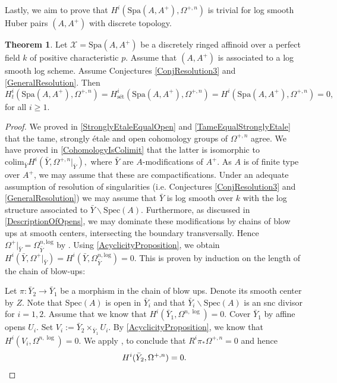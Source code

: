 \documentclass{amsart}
\def\Spa{\textrm{Spa}}
\def\Spec{\textrm{Spec}}
\theoremstyle{definition}
\newtheorem{theorem}{Theorem}[section]
\newcommand\llog{\mathrm{log}}
\numberwithin{equation}{section}
\begin{document}
Lastly, we aim to prove that  $H^{i}(\Spa(A,A^+),\Omega^{+,n})$ is trivial for log smooth Huber pairs $(A,A^+)$ with discrete topology. 
\begin{theorem}\label{CohomologyOfOmega+IsZero}
	Let $\mathcal{X}=\Spa(A,A^+)$ be a discretely ringed affinoid over a perfect field $k$ of positive characteristic $p$. Assume that $(A,A^+)$ is associated to a log smooth log scheme. Assume Conjectures \ref{ConjResolution3} and \ref{GeneralResolution}. Then
	\[
	H^i_t(\Spa(A,A^+),\Omega^{+,n})=H^i_{\textrm{s\'et}}(\Spa(A,A^+),\Omega^{+,n})=H^i(\Spa(A,A^+),\Omega^{+,n})=0,
	\] 
	for all $i\geq 1$.
\end{theorem}
\begin{proof}
	We proved in \cref{StronglyEtaleEqualOpen} and \cref{TameEqualStronglyEtale} that the tame, strongly \'etale and open cohomology groups of $\Omega^{+,n}$ agree.
	We have proved in \cref{CohomologyIsColimit} that the latter is isomorphic to
	 $\textrm{colim}_{\bar{Y}}H^i(\bar{Y},\Omega^{+,n}|_{\bar{Y}}),$
	where $\bar{Y}$ are $A$-modifications of $A^+$. As $A$ is of finite type over $A^+$, we may assume that these are compactifications. Under an adequate assumption of resolution of singularities (i.e. Conjectures \ref{ConjResolution3} and \ref{GeneralResolution}) we may assume that $\bar{Y}$ is log smooth over $k$ with the log structure associated to $\bar{Y}\backslash \Spec(A)$. Furthermore, as discussed in \cref{DescriptionOfOpens}, we may dominate these modifications by chains of blow ups at smooth centers, intersecting the boundary transversally.  Hence $\Omega^+|_{\bar{Y}}=\Omega^{n,\llog}_{\bar{Y}}$ by \cite[Theorem 8.12]{LogDiff}. Using \cref{AcyclicityProposition}, we obtain $H^i(\bar{Y},\Omega^+|_{\bar{Y}})=H^i(\bar{Y},\Omega^{n,\llog}_{\bar{Y}})=0$. This is proven by induction on the length of the chain of blow-ups:
	
	Let $\pi:\bar{Y}_2\to \bar{Y}_1$ be a morphism in the chain of blow ups. Denote its smooth center by $Z$. Note that $\Spec(A)$ is open in $\bar{Y}_i$ and that $\bar{Y}_i\backslash \Spec(A)$ is an snc divisor for $i=1,2$.  Assume that we know that $H^i(\bar{Y}_1, \Omega^{n,\log})=0$. Cover $\bar{Y}_1$ by affine opens $U_i$. Set $V_i:=\bar{Y}_2\times_{\bar{Y}_1}U_i$. By \cref{AcyclicityProposition}, we know that $H^i(V_i,\Omega^{n,\log}) =0$. We apply \cite[Proposition 02O5]{Stacks}, to conclude that $R^i\pi_*\Omega^{+,n}=0$ and hence
	\[
	H^i(\bar{Y}_2, \Omega^{+,n})=0. \qedhere
	\]
\end{proof}
\end{document}
